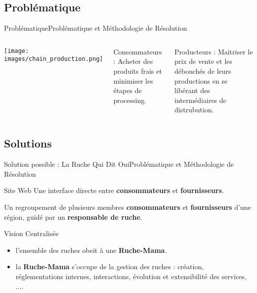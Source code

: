 \documentclass[usenames,dvipsnames]{beamer}
\begin{document}
\subsection{Problématique}
\begin{frame}{Problématique}{Problématique et Méthodologie de Résolution}
\begin{columns}[onlytextwidth, T]
  \column{55mm}
    \texttt{[image: images/chain\_production.png]}

  \column{\dimexpr\linewidth-40mm-2mm}
    \begin{block}{Consommateurs :}
    Acheter des produits frais et minimiser les étapes de processing.
    \end{block}

    \begin{block}{Producteurs :}
      Maitriser le prix de vente et les débouchés de leurs productions en se libérant des intermédiaires de distrubution.
    \end{block}
\end{columns}
\end{frame}

\subsection{Solutions}
\begin{frame}{Solution possible : La Ruche Qui Dit Oui}{Problématique et Méthodologie de Résolution}
\begin{block}{Site Web}
Une interface directe entre \textbf{consommateurs} et \textbf{fournisseurs}.
\end{block}

\begin{definition}[Ruche]
Un regroupement de plusieurs membres \textbf{consommateurs} et \textbf{fournisseurs} d'une région, guidé par un \textbf{responsable de ruche}.
\end{definition}

\begin{block}{Vision Centralisée}
\begin{itemize}
  \item l'ensemble des ruches obeit à une \textbf{Ruche-Mama}.
  \item la \textbf{Ruche-Mama} s'occupe de la gestion des ruches : création, réglementations internes, interactions, évolution et extensibilité des services, $\dots$.
\end{itemize}
\end{block}
\end{frame}
\end{document}

